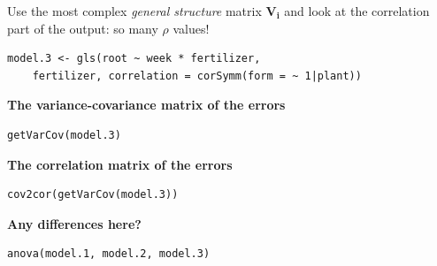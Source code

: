 \documentclass{beamer}
\begin{document}
\begin{frame}[fragile]{}
\begin{columns}
\begin{column}{0.5\textwidth}
        \end{column}
    \end{columns}
\end{frame}

\begin{frame}[fragile]{}
  Use the most complex \textit{general structure} matrix $\mathbf{V_i}$ and look at the correlation part of the output: so many $\rho$ values!
  \tiny
  \begin{verbatim}
model.3 <- gls(root ~ week * fertilizer, 
    fertilizer, correlation = corSymm(form = ~ 1|plant))
  \end{verbatim}
  \tiny\scalebox{0.9}{
     
     } 
\end{frame}

\begin{frame}[fragile]{}
    \small
    \textbf{The variance-covariance matrix of the errors}
    \begin{verbatim}
getVarCov(model.3)
    \end{verbatim}
    \scalebox{0.7}{
     
     } 
     \vspace{0.5cm}
     
     \textbf{The correlation matrix of the errors}
     \begin{verbatim}
cov2cor(getVarCov(model.3))
     \end{verbatim}
\end{frame}

\begin{frame}[fragile]{}
    \textbf{Any differences here?}
    \begin{verbatim}
anova(model.1, model.2, model.3)
    \end{verbatim}
    \tiny\scalebox{1.2}{
     
     } 
\end{frame}
\end{document}
